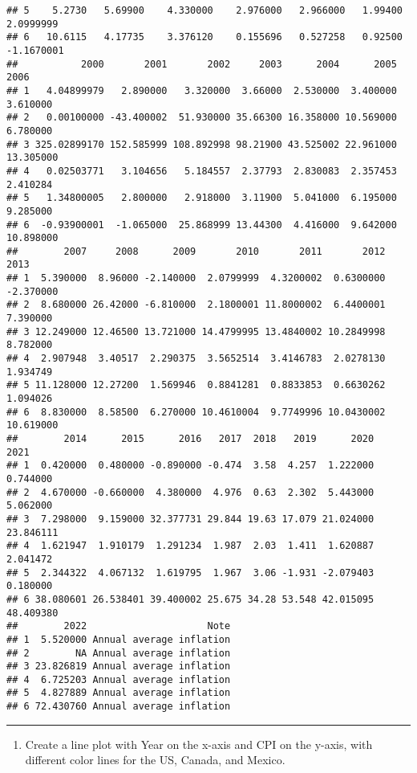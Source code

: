\documentclass[
]{article}
\providecommand{\tightlist}{%
  \setlength{\itemsep}{0pt}\setlength{\parskip}{0pt}}
\begin{document}
\begin{verbatim}
## 5    5.2730   5.69900    4.330000    2.976000   2.966000   1.99400   2.0999999
## 6   10.6115   4.17735    3.376120    0.155696   0.527258   0.92500  -1.1670001
##           2000       2001       2002     2003      2004      2005      2006
## 1   4.04899979   2.890000   3.320000  3.66000  2.530000  3.400000  3.610000
## 2   0.00100000 -43.400002  51.930000 35.66300 16.358000 10.569000  6.780000
## 3 325.02899170 152.585999 108.892998 98.21900 43.525002 22.961000 13.305000
## 4   0.02503771   3.104656   5.184557  2.37793  2.830083  2.357453  2.410284
## 5   1.34800005   2.800000   2.918000  3.11900  5.041000  6.195000  9.285000
## 6  -0.93900001  -1.065000  25.868999 13.44300  4.416000  9.642000 10.898000
##        2007     2008      2009       2010       2011       2012      2013
## 1  5.390000  8.96000 -2.140000  2.0799999  4.3200002  0.6300000 -2.370000
## 2  8.680000 26.42000 -6.810000  2.1800001 11.8000002  6.4400001  7.390000
## 3 12.249000 12.46500 13.721000 14.4799995 13.4840002 10.2849998  8.782000
## 4  2.907948  3.40517  2.290375  3.5652514  3.4146783  2.0278130  1.934749
## 5 11.128000 12.27200  1.569946  0.8841281  0.8833853  0.6630262  1.094026
## 6  8.830000  8.58500  6.270000 10.4610004  9.7749996 10.0430002 10.619000
##        2014      2015      2016   2017  2018   2019      2020      2021
## 1  0.420000  0.480000 -0.890000 -0.474  3.58  4.257  1.222000  0.744000
## 2  4.670000 -0.660000  4.380000  4.976  0.63  2.302  5.443000  5.062000
## 3  7.298000  9.159000 32.377731 29.844 19.63 17.079 21.024000 23.846111
## 4  1.621947  1.910179  1.291234  1.987  2.03  1.411  1.620887  2.041472
## 5  2.344322  4.067132  1.619795  1.967  3.06 -1.931 -2.079403  0.180000
## 6 38.080601 26.538401 39.400002 25.675 34.28 53.548 42.015095 48.409380
##        2022                     Note
## 1  5.520000 Annual average inflation
## 2        NA Annual average inflation
## 3 23.826819 Annual average inflation
## 4  6.725203 Annual average inflation
## 5  4.827889 Annual average inflation
## 6 72.430760 Annual average inflation
\end{verbatim}

\begin{center}\rule{0.5\linewidth}{0.5pt}\end{center}

\begin{enumerate}
\def\labelenumi{\arabic{enumi}.}
\tightlist
\item
  Create a line plot with Year on the x-axis and CPI on the y-axis, with
  different color lines for the US, Canada, and Mexico.
\end{enumerate}
\end{document}
